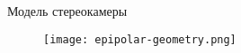 
\begin{frame}{Модель стереокамеры}
\begin{figure}
\centering
\texttt{[image: epipolar-geometry.png]}
\end{figure}
\end{frame}